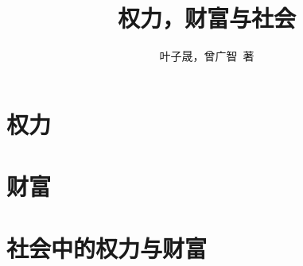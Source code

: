 \documentclass[12pt,heading=true]{book}
\begin{document}
\title{权力，财富与社会}
\author{叶子晟，曾广智\ 著}
\date{}
\maketitle

\tableofcontents

\part{权力}





\part{财富}

\part{社会中的权力与财富}


\end{document}
